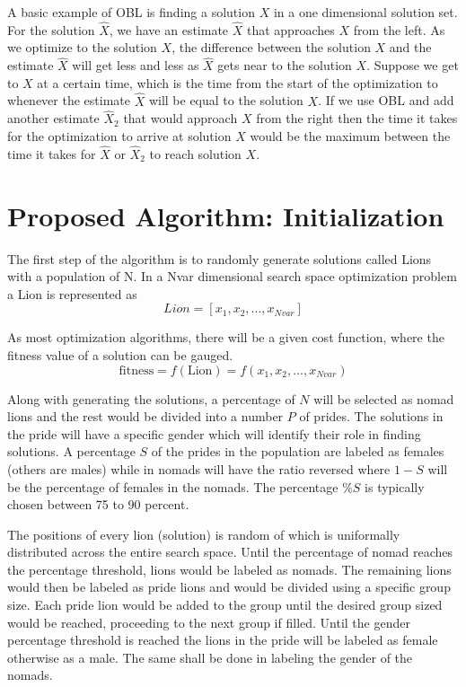 \par A basic example of OBL is finding a solution $X$ in a one dimensional solution set. For the solution $\hat{X}$, we have an estimate $\hat{X}$ that approaches $X$ from the left. As we optimize to the solution $X$, the difference between the solution $X$ and the estimate $\hat{X}$ will get less and less as $\hat{X}$ gets near to the solution $X$. Suppose we get to $X$ at a certain time, which is the time from the start of the optimization to whenever the estimate $\hat{X}$ will be equal to the solution $ X $. If we use OBL and add another estimate $\hat{X}_2$ that would approach $X$ from the right then the time it takes for the optimization to arrive at solution $X$ would be the maximum between the time it takes for $\hat{X}$ or $\hat{X}_2$ to reach solution $X$.

\section{Proposed Algorithm: Initialization}
\par The first step of the algorithm is to randomly generate solutions called Lions with a population of N. In a Nvar dimensional search space optimization problem a Lion is represented as
$$Lion = [x_1, x_2,..., x_{Nvar}]$$
\par As most optimization algorithms, there will be a given cost function, where the fitness value of a solution can be gauged.
$$\text{fitness} = f(\text{Lion}) = f(x_1, x_2,..., x_{Nvar})$$
\par Along with generating the solutions, a percentage of $N$ will be selected as nomad lions and the rest would be divided into a number $P$ of prides. The solutions in the pride will have a specific gender which will identify their role in finding solutions. A percentage $S$ of the prides in the population are labeled as females (others are males) while in nomads will have the ratio reversed where $1-S$ will be the percentage of females in the nomads. The percentage $\%S$ is typically chosen between 75 to 90 percent.

\par The positions of every lion (solution) is random of which is uniformally distributed across the entire search space. Until the percentage of nomad reaches the percentage threshold, lions would be labeled as nomads. The remaining lions would then be labeled as pride lions and would be divided using a specific group size. Each pride lion would be added to the group until the desired group sized would be reached, proceeding to the next group if filled. Until the gender percentage threshold is reached the lions in the pride will be labeled as female otherwise as a male. The same shall be done in labeling the gender of the nomads.

